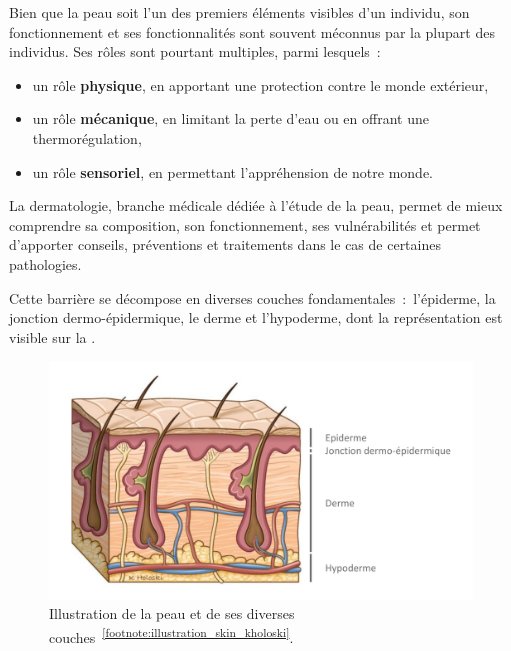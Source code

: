 Bien que la peau soit l'un des premiers éléments visibles d'un individu, son fonctionnement et ses fonctionnalités sont souvent méconnus par la plupart des individus. Ses rôles sont pourtant multiples, parmi lesquels~:
\begin{itemize}
    \item un rôle \textbf{physique}, en apportant une protection contre le monde extérieur,
    \item un rôle \textbf{mécanique}, en limitant la perte d’eau ou en offrant une thermorégulation,
    \item un rôle \textbf{sensoriel}, en permettant l'appréhension de notre monde.
\end{itemize}\par

La dermatologie, branche médicale dédiée à l’étude de la peau, permet de mieux comprendre sa composition, son fonctionnement, ses vulnérabilités et permet d’apporter conseils, préventions et traitements dans le cas de certaines pathologies.\par

Cette barrière se décompose en diverses couches fondamentales~:~l’épiderme, la jonction dermo-épidermique, le derme et l’hypoderme, dont la représentation est visible sur la .\par
\begin{figure}[H]
    \centering
    \includegraphics[width=0.6\linewidth]{contents/chapter_1/resources/illustration_skin_kholoski.pdf}
    \caption{Illustration de la peau et de ses diverses couches~\textsuperscript{\ref{footnote:illustration_skin_kholoski}}.}
    \label{fig:illustration_skin_kholoski}
\end{figure}\par 

\addtocounter{footnote}{1}

